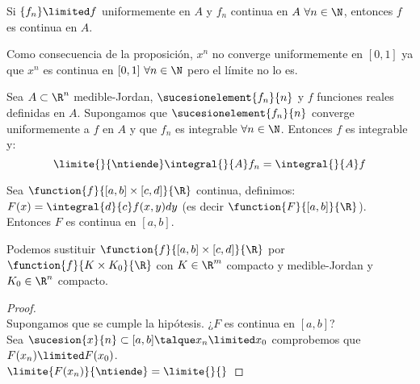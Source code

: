 \begin{proposicion} Si $\{f_n\}\limited f$ uniformemente en $A$ y $f_n$ continua en $A\ \forall n\in\N$, entonces $f$ es continua en $A$.
\begin{observacion}
\end{observacion} Como consecuencia de la proposición, $x^n$ no converge uniformemente en $[0,1]$ ya que $x^n$ es continua en $[0,1]\ \forall n\in\N$ pero el límite no lo es.
\end{proposicion}

\begin{teor} Sea $A\subset\R^n$ medible-Jordan, $\sucesionelement{f_n}{n}$ y $f$ funciones reales definidas en $A$. Supongamos que $\sucesionelement{f_n}{n}$ converge uniformemente a $f$ en $A$ y que $f_n$ es integrable $\forall n\in\N$. Entonces $f$ es integrable y:
\[\limite{}{\ntiende}\integral{}{A}f_n=\integral{}{A}f\]
\end{teor}

\begin{teor} Sea $\function{f}{[a,b]\times[c,d]}{\R}$ continua, definimos:\\
$F(x)=\integral{d}{c}f(x,y)dy$ (es decir $\function{F}{[a,b]}{\R}$).\\
Entonces $F$ es continua en $[a,b]$.
\begin{nota} Podemos sustituir $\function{f}{[a,b]\times[c,d]}{\R}$ por $\function{f}{K\times K_0}{\R}$ con $K\in \R^m$ compacto y medible-Jordan y $K_0\in\R^n$ compacto.
\end{nota}
\begin{proof} \ \\
Supongamos que se cumple la hipótesis. ¿$F$ es continua en $[a,b]$?\\
Sea $\sucesion{x}{n}\subset[a,b]\talque x_n\limited x_0$ comprobemos que $F(x_n)\limited F(x_0)$.\\
$\limite{F(x_n)}{\ntiende}=\limite{}{}$
\end{proof}
\end{teor}